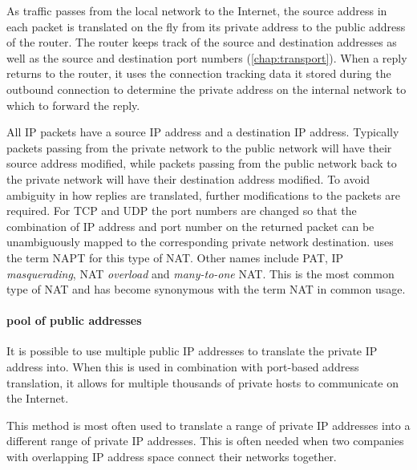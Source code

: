 As traffic passes from the local network to the Internet, the source address in each packet is translated on the fly from its private address to the public address of the router.
The router keeps track of the source and destination addresses as well as the source and destination port numbers (\vref{chap:transport}).
When a reply returns to the router, it uses the connection tracking data it stored during the outbound connection to determine the private address on the internal network to which to forward the reply.

All \acs{IP} packets have a source \acs{IP} address and a destination \acs{IP} address.
Typically packets passing from the private network to the public network will have their source address modified, while packets passing from the public network back to the private network will have their destination address modified.
To avoid ambiguity in how replies are translated, further modifications to the packets are required.
For \acs{TCP} and \acs{UDP} the port numbers are changed so that the combination of \acs{IP} address and port number on the returned packet can be unambiguously mapped to the corresponding private network destination.
 uses the term \gls{NAPT} for this type of \acs{NAT}.
Other names include \gls{PAT}, \acs{IP} \emph{masquerading}, \acs{NAT} \emph{overload} and \emph{many-to-one} \acs{NAT}.
This is the most common type of \acs{NAT} and has become synonymous with the term \acs{NAT} in common usage.

\paragraph{pool of public addresses}
It is possible to use multiple public \acs{IP} addresses to translate the private \acs{IP} address into.
When this is used in combination with port-based address translation, it allows for multiple thousands of private hosts to communicate on the Internet.

This method is most often used to translate a range of private \acs{IP} addresses into a different range of private \acs{IP} addresses.
This is often needed when two companies with overlapping \acs{IP} address space connect their networks together.






